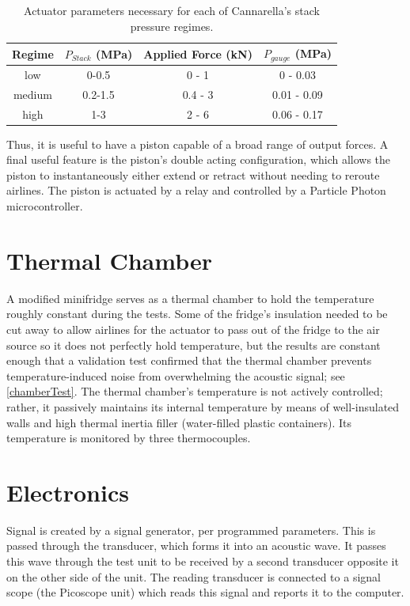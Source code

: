 \begin{table}[h]
    \centering
    \begin{tabular}{c|c|c|c}
         Regime & $P_{Stack}$ (MPa) & Applied Force (kN) & $P_{gauge}$ (MPa) \\
         \hline
         low & 0-0.5 & 0 - 1 & 0 - 0.03 \\
         medium & 0.2-1.5 & 0.4 - 3 & 0.01 - 0.09 \\
         high & 1-3 & 2 - 6 & 0.06 - 0.17 \\
    \end{tabular}
    \caption{Actuator parameters necessary for each of Cannarella's stack pressure regimes.}
    \label{tab:stackpressure}
\end{table}

Thus, it is useful to have a piston capable of a broad range of output forces. A final useful feature is the piston's double acting configuration, which allows the piston to instantaneously either extend or retract without needing to reroute airlines. The piston is actuated by a relay and controlled by a Particle Photon microcontroller.

\section{Thermal Chamber}\label{thermalChamber}
A modified minifridge serves as a thermal chamber to hold the temperature roughly constant during the tests. 
Some of the fridge's insulation needed to be cut away to allow airlines for the actuator to pass out of the fridge to the air source so it does not perfectly hold temperature, but the results are constant enough that a validation test confirmed that the thermal chamber prevents temperature-induced noise from overwhelming the acoustic signal; see \hyperref[chamberTest]{\cref{chamberTest}}.  
The thermal chamber's temperature is not actively controlled; rather, it passively maintains its internal temperature by means of well-insulated walls and high thermal inertia filler (water-filled plastic containers). 
Its temperature is monitored by three thermocouples.

\section{Electronics}

Signal is created by a signal generator, per programmed parameters. This is passed through the transducer, which forms it into an acoustic wave. It passes this wave through the test unit to be received by a second transducer opposite it on the other side of the unit. The reading transducer is connected to a signal scope (the Picoscope unit) which reads this signal and reports it to the computer.

